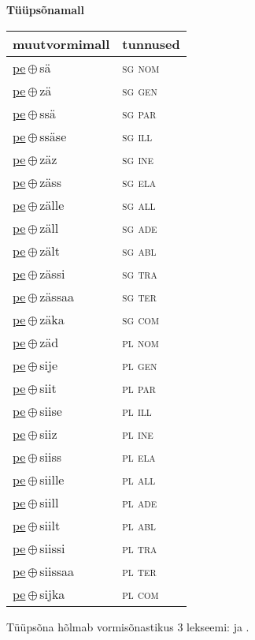 

\vspace{3.5em}
\noindent \begin{minipage}{\textwidth}
\noindent \textbf{Tüüpsõnamall \,}\\

\begin{sideways}
\begin{tabular}{l l}
muutvormimall & tunnused \\
\hline
\underline{pe}\,$\oplus$\,sä & \textsc{ sg nom } \\
\underline{pe}\,$\oplus$\,zä & \textsc{ sg gen } \\
\underline{pe}\,$\oplus$\,ssä & \textsc{ sg par } \\
\underline{pe}\,$\oplus$\,ssäse & \textsc{ sg ill } \\
\underline{pe}\,$\oplus$\,zäz & \textsc{ sg ine } \\
\underline{pe}\,$\oplus$\,zäss & \textsc{ sg ela } \\
\underline{pe}\,$\oplus$\,zälle & \textsc{ sg all } \\
\underline{pe}\,$\oplus$\,zäll & \textsc{ sg ade } \\
\underline{pe}\,$\oplus$\,zält & \textsc{ sg abl } \\
\underline{pe}\,$\oplus$\,zässi & \textsc{ sg tra } \\
\underline{pe}\,$\oplus$\,zässaa & \textsc{ sg ter } \\
\underline{pe}\,$\oplus$\,zäka & \textsc{ sg com } \\
\underline{pe}\,$\oplus$\,zäd & \textsc{ pl nom } \\
\underline{pe}\,$\oplus$\,sije & \textsc{ pl gen } \\
\underline{pe}\,$\oplus$\,siit & \textsc{ pl par } \\
\underline{pe}\,$\oplus$\,siise & \textsc{ pl ill } \\
\underline{pe}\,$\oplus$\,siiz & \textsc{ pl ine } \\
\underline{pe}\,$\oplus$\,siiss & \textsc{ pl ela } \\
\underline{pe}\,$\oplus$\,siille & \textsc{ pl all } \\
\underline{pe}\,$\oplus$\,siill & \textsc{ pl ade } \\
\underline{pe}\,$\oplus$\,siilt & \textsc{ pl abl } \\
\underline{pe}\,$\oplus$\,siissi & \textsc{ pl tra } \\
\underline{pe}\,$\oplus$\,siissaa & \textsc{ pl ter } \\
\underline{pe}\,$\oplus$\,sijka & \textsc{ pl com } \\
\end{tabular}
\end{sideways}
\label{tab:tüüpsõnamall-pesä}

\end{minipage}

 
\vspace{1em}
\noindent Tüüpsõna hõlmab vormisõnastikus 3 lekseemi:  ja .
